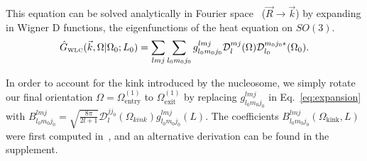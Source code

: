 \documentclass[%
 reprint,
superscriptaddress,
showpacs,preprintnumbers,
 amsmath,amssymb,
 aps,
 prl,
]{revtex4-1}
\newcommand{\ghat}[2][\Omega_0; L_0]{\hat{G}_\text{\tiny WLC}(#2|#1)}
\newcommand{\wigD}{\mathcal{D}}
\begin{document}
This equation can be solved analytically in Fourier space~\cite{spakowitz2006}
    ($\vec{R} \rightarrow \vec{k}$) by expanding in Wigner D functions, the
    eigenfunctions of the heat equation on $SO(3)$.
\begin{equation}\label{eq:expansion}
    \ghat{\vec{k}, \Omega} = \sum_{l m j}\sum_{l_0 m_0 j_0} g_{l_0 m_0 j_0}^{lmj}
        \wigD_l^{mj}(\Omega)\wigD_{l_0}^{m_0 j_0 *}(\Omega_0).
\end{equation}

In order to account for the kink introduced by the nucleosome, we simply rotate
    our final orientation ${\Omega = \Omega_\text{entry}^{(1)}}$ to
    $\Omega_\text{exit}^{(1)}$ by replacing
    $g_{l_0 m_0 j_0}^{lmj}$ in Eq.~\ref{eq:expansion} with $B_{l_{0}m_{0}j_{0}}^{lmj} =
    \sqrt{\frac{8\pi}{2l+1}} \mathcal{D}_{l}^{jj_{0}}
    \left(\Omega_{kink}\right)g_{l_{0}m_{0}j_{0}}^{lmj}\left(L\right)$.
The coefficients $B_{l_0 m_0 j_0}^{lmj}(\Omega_\text{kink}, L)$ were first computed
    in~\cite{zhou2003}, and an alternative derivation can be found in the supplement.
\end{document}

